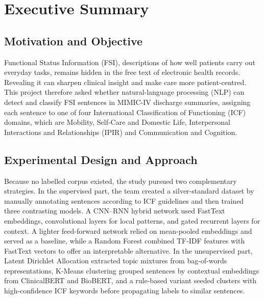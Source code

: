 \chapter{Executive Summary}

\section{Motivation and Objective}

Functional Status Information (FSI), descriptions of how well patients carry out everyday tasks, remains hidden in the free text of electronic health records. Revealing it can sharpen clinical insight and make care more patient-centred. This project therefore asked whether natural-language processing (NLP) can detect and classify FSI sentences in MIMIC-IV discharge summaries, assigning each sentence to one of four International Classification of Functioning (ICF) domains, which are Mobility, Self-Care and Domestic Life, Interpersonal Interactions and Relationships (IPIR) and Communication and Cognition. \medskip

\section{Experimental Design and Approach}

Because no labelled corpus existed, the study pursued two complementary strategies. In the supervised part, the team created a silver-standard dataset by manually annotating sentences according to ICF guidelines and then trained three contrasting models. A CNN–RNN hybrid network used FastText embeddings, convolutional layers for local patterns, and gated recurrent layers for context. A lighter feed-forward network relied on mean-pooled embeddings and served as a baseline, while a Random Forest combined TF-IDF features with FastText vectors to offer an interpretable alternative. In the unsupervised part, Latent Dirichlet Allocation extracted topic mixtures from bag-of-words representations, K-Means clustering grouped sentences by contextual embeddings from ClinicalBERT and BioBERT, and a rule-based variant seeded clusters with high-confidence ICF keywords before propagating labels to similar sentences. \medskip

